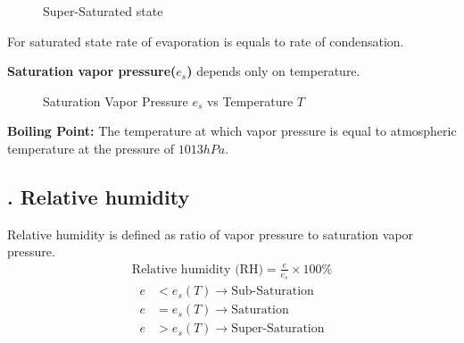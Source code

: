 \documentclass[fleqn,10pt]{SelfArx} %
\begin{document}
\begin{figure}[h!]
    \centering
    \caption{Super-Saturated state}
\end{figure}
For saturated state rate of evaporation is equals to rate of condensation.

\textbf{Saturation vapor pressure($e_s$)} depends only on temperature.

\begin{figure}[htb!]
    \caption{Saturation Vapor Pressure $e_s$ vs Temperature $T$}
\end{figure}

\textbf{Boiling Point:} The temperature at which vapor pressure is equal to atmospheric temperature at the pressure of $1013 hPa$.

\subsection{. Relative humidity}
Relative humidity is defined as ratio of vapor pressure to saturation vapor pressure.
\begin{align}
    \text{Relative humidity (RH)} = \frac{e}{e_s} \times 100\%
\end{align}
\begin{align}
    e &< e_s(T) \rightarrow \text{Sub-Saturation} \\
    e &= e_s(T) \rightarrow \text{Saturation} \\
    e &> e_s(T) \rightarrow \text{Super-Saturation}
\end{align}
\end{document}
